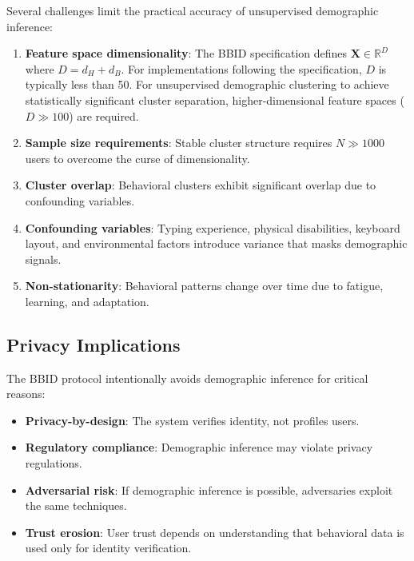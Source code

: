 \documentclass[11pt,twoside]{amsart}
\theoremstyle{plain}
\theoremstyle{definition}
\theoremstyle{remark}
\newcommand{\bX}{\mathbf{X}}
\newcommand{\bbR}{\mathbb{R}}
\begin{document}
Several challenges limit the practical accuracy of unsupervised demographic inference:

\begin{enumerate}
    \item \textbf{Feature space dimensionality}: The BBID specification defines $\bX \in \bbR^D$ where $D = d_H + d_B$. For implementations following the specification, $D$ is typically less than 50. For unsupervised demographic clustering to achieve statistically significant cluster separation, higher-dimensional feature spaces ($D \gg 100$) are required.
    
    \item \textbf{Sample size requirements}: Stable cluster structure requires $N \gg 1000$ users to overcome the curse of dimensionality.
    
    \item \textbf{Cluster overlap}: Behavioral clusters exhibit significant overlap due to confounding variables.
    
    \item \textbf{Confounding variables}: Typing experience, physical disabilities, keyboard layout, and environmental factors introduce variance that masks demographic signals.
    
    \item \textbf{Non-stationarity}: Behavioral patterns change over time due to fatigue, learning, and adaptation.
\end{enumerate}

\subsection{Privacy Implications}

The BBID protocol intentionally avoids demographic inference for critical reasons:

\begin{itemize}
    \item \textbf{Privacy-by-design}: The system verifies identity, not profiles users.
    \item \textbf{Regulatory compliance}: Demographic inference may violate privacy regulations.
    \item \textbf{Adversarial risk}: If demographic inference is possible, adversaries exploit the same techniques.
    \item \textbf{Trust erosion}: User trust depends on understanding that behavioral data is used only for identity verification.
\end{itemize}
\end{document}
